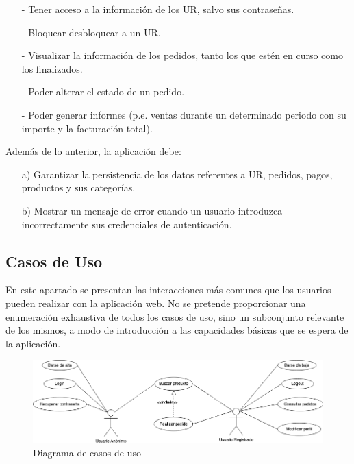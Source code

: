 \documentclass[a4paper]{article}
\begin{document}
\begin{enumerate}
\begin{itemize}
                    \item[-] Tener acceso a la información de los UR, salvo sus contraseñas.
                    \item[-] Bloquear-desbloquear a un UR.
                    \item[-] Visualizar la información de los pedidos, tanto los que estén en curso como los finalizados.
                    \item[-] Poder alterar el estado de un pedido.
                    \item[-] Poder generar informes (p.e. ventas durante un determinado periodo con su importe y la facturación total).
                \end{itemize}
            \end{enumerate}

            Además de lo anterior, la aplicación debe:
            \begin{enumerate}
                \item[a)] Garantizar la persistencia de los datos referentes a UR, pedidos, pagos, productos y sus categorías.
                \item[b)] Mostrar un mensaje de error cuando un usuario introduzca incorrectamente sus credenciales de autenticación.
            \end{enumerate}

        \subsection{Casos de Uso}
            En este apartado se presentan las interacciones más comunes que los usuarios pueden realizar con la aplicación web. No se pretende proporcionar una enumeración exhaustiva de todos los casos de uso, sino un subconjunto relevante de los mismos, a modo de introducción a las capacidades básicas que se espera de la aplicación.

            \begin{figure}[htb!]
                \centering
                \includegraphics[width=\textwidth]{use-case_diagram}
                \caption{Diagrama de casos de uso}
                \label{fig:use-case_diagram}
            \end{figure}
\end{document}
